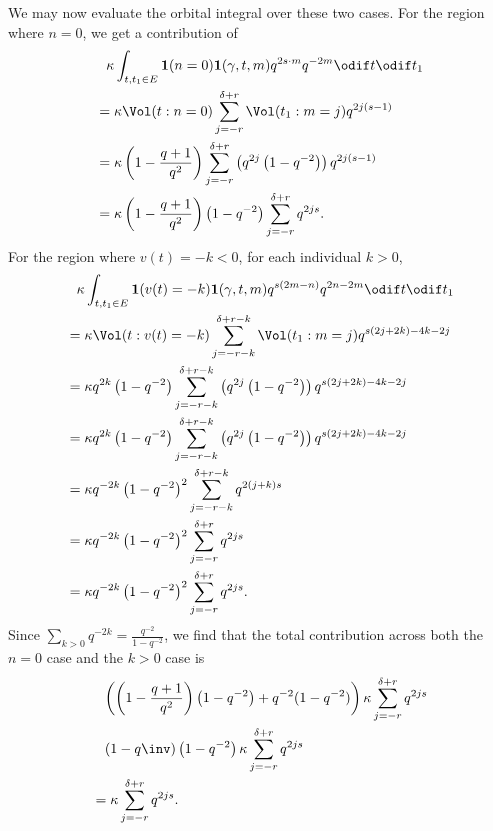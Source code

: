We may now evaluate the orbital integral over these two cases.
For the region where $n = 0$, we get a contribution of
\begin{align*}
  &\phantom= \kappa \int_{t, t_1 \in E} \mathbf{1}(n=0) \mathbf{1}(\gamma,t,m)
    q^{2s \cdot m} q^{-2m} \odif t \odif t_1 \\
  &= \kappa \Vol(t: n =0) \sum_{j=-r}^{\delta+r} \Vol(t_1: m=j) q^{2j(s-1)} \\
  &= \kappa \left( 1 - \frac{q+1}{q^2} \right) \sum_{j=-r}^{\delta+r}
  \left( q^{2j} \left( 1-q^{-2} \right) \right) q^{2j(s-1)} \\
  &= \kappa \left( 1 - \frac{q+1}{q^2} \right) \left( 1-q^{-2} \right)
  \sum_{j=-r}^{\delta+r} q^{2js}.
\end{align*}
For the region where $v(t) = -k < 0$, for each individual $k > 0$,
\begin{align*}
  &\phantom= \kappa \int_{t, t_1 \in E} \mathbf{1}(v(t)=-k) \mathbf{1}(\gamma,t,m)
    q^{s(2m-n)} q^{2n-2m} \odif t \odif t_1 \\
  &= \kappa \Vol(t: v(t)=-k) \sum_{j=-r-k}^{\delta+r-k}
    \Vol(t_1: m=j) q^{s(2j+2k)-4k-2j} \\
  &= \kappa q^{2k} \left( 1 - q^{-2} \right) \sum_{j=-r-k}^{\delta+r-k}
    \left( q^{2j} \left( 1-q^{-2} \right) \right) q^{s(2j+2k)-4k-2j} \\
  &= \kappa q^{2k} \left( 1 - q^{-2} \right) \sum_{j=-r-k}^{\delta+r-k}
    \left( q^{2j} \left( 1-q^{-2} \right) \right) q^{s(2j+2k)-4k-2j} \\
  &= \kappa q^{-2k} \left( 1 - q^{-2} \right)^2
    \sum_{j=-r-k}^{\delta+r-k} q^{2(j+k)s} \\
  &= \kappa q^{-2k} \left( 1 - q^{-2} \right)^2 \sum_{j=-r}^{\delta+r} q^{2js} \\
  &= \kappa q^{-2k} \left( 1 - q^{-2} \right)^2 \sum_{j=-r}^{\delta+r} q^{2js}.
\end{align*}
Since $\sum_{k > 0} q^{-2k} = \frac{q^{-2}}{1-q^{-2}}$,
we find that the total contribution across both
the $n=0$ case and the $k > 0$ case is
\begin{align*}
  &\phantom= \left( \left( 1 - \frac{q+1}{q^2} \right) \left( 1-q^{-2} \right)
    + q^{-2}(1-q^{-2})  \right) \kappa \sum_{j=-r}^{\delta+r} q^{2js} \\
  &\phantom= \left( 1-q\inv \right) \left(1-q^{-2}  \right)
    \kappa \sum_{j=-r}^{\delta+r} q^{2js} \\
  &= \kappa \sum_{j=-r}^{\delta+r} q^{2js}.
\end{align*}

